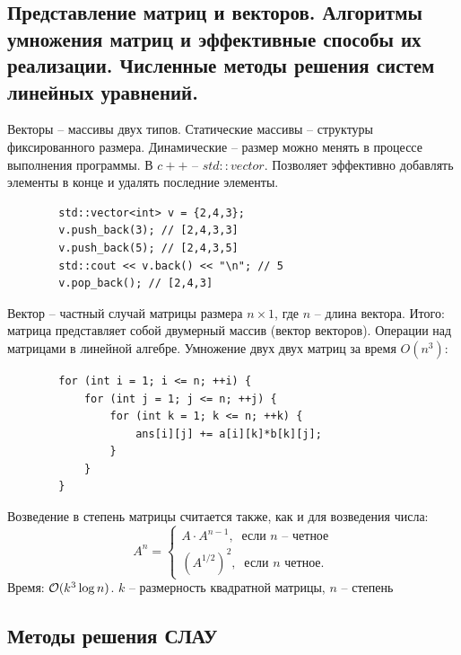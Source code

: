 \begin{multicols}{2}
    \section{Представление матриц и векторов. Алгоритмы умножения матриц и эффективные
    способы их реализации. Численные методы решения систем линейных уравнений.}
    Векторы -- массивы двух типов. Статические массивы -- структуры фиксированного размера. Динамические -- размер можно менять в процессе выполнения программы. В $c++$ -- $std::vector$. Позволяет эффективно добавлять элементы в конце и удалять последние элементы.
    \begin{lstlisting}
        std::vector<int> v = {2,4,3};
        v.push_back(3); // [2,4,3,3]
        v.push_back(5); // [2,4,3,5]
        std::cout << v.back() << "\n"; // 5
        v.pop_back(); // [2,4,3]
    \end{lstlisting}
    Вектор -- частный случай матрицы размера $n\times 1$, где $n$ -- длина вектора. Итого: матрица представляет собой двумерный массив (вектор векторов). Операции над матрицами в линейной алгебре. Умножение двух двух матриц за время $O(n^3)$:
    \begin{lstlisting}
        for (int i = 1; i <= n; ++i) {
            for (int j = 1; j <= n; ++j) {
                for (int k = 1; k <= n; ++k) {
                    ans[i][j] += a[i][k]*b[k][j];
                }
            }
        }
    \end{lstlisting} 
    Возведение в степень матрицы считается также, как и для возведения числа:
    \[
        A^n = \left\{\begin{array}{c}
            A \cdot A^{n-1}, \ \text{ если $n$ -- четное}\\
            \left(A^{1/2}\right)^2, \ \text{ если $n$ четное}.              
        \end{array}
            \right.  
    \]  
    Время: ${\cal O}(k^3 \log n)$. $k$ -- размерность квадратной матрицы, $n$ -- степень
    \subsection*{Методы решения СЛАУ}

\end{multicols}
